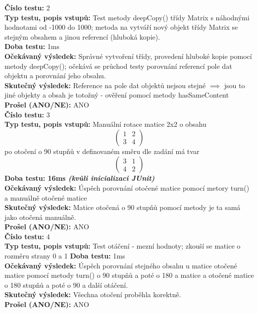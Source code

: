 \documentclass[a4paper,12pt]{article}
\begin{document}
     \textbf{Číslo testu:} 2\\
     \textbf{Typ testu, popis vstupů:} Test metody deepCopy() třídy Matrix s náhodnými hodnotami od -1000 do 1000;
     metoda na vytváří nový objekt třídy Matrix se stejným obsahem a jinou referencí (hluboká kopie).\\
     \textbf{Doba testu:} 1ms\\
     \textbf{Očekávaný výsledek:} Správné vytvoření třídy, provedení hluboké kopie pomocí metody deepCopy(); očekává se průchod testy porovnání referencí pole dat objektu a porovnání jeho obsahu.\\
     \textbf{Skutečný výsledek:} Reference na pole dat objektů nejsou stejné $\implies$ jsou to jiné objekty a obsah je totožný - ověření pomocí metody hasSameContent\\
     \textbf{Prošel (ANO/NE):} ANO\\

     \textbf{Číslo testu:} 3\\
     \textbf{Typ testu, popis vstupů:} Manuální rotace matice 2x2 o obsahu
          \[\begin{pmatrix}
               1 & 2 \\
               3 & 4
          \end{pmatrix}\] po otočení o 90 stupňů v definovaném směru dle zadání má tvar\\
          \[\begin{pmatrix}
                    3 & 1\\
                    4 & 2
          \end{pmatrix}\]
     \textbf{Doba testu: 16ms \textit{(kvůli inicializaci JUnit)}} \\
     \textbf{Očekávaný výsledek:} Úspěch porovnání otočené matice pomocí metory turn() a manuálně otočené matice\\
     \textbf{Skutečný výsledek:} Matice otočená o 90 stupňů pomocí metody je ta samá jako otočená manuálně.\\
     \textbf{Prošel (ANO/NE):} ANO\\

     \textbf{Číslo testu:} 4\\
     \textbf{Typ testu, popis vstupů:} Test otáčení - mezní hodnoty; zkouší se matice o rozměru strany 0 a 1
     \textbf{Doba testu:} 1ms \\
     \textbf{Očekávaný výsledek:} Úspěch porovnání stejného obsahu u matice otočené matice pomocí metody turn()
     o 90 stupňů a poté o 180 a matice a otočené matice o 180 stupňů a poté o 90 a další otáčení.\\
     \textbf{Skutečný výsledek:} Všechna otočení proběhla korektně.\\
     \textbf{Prošel (ANO/NE):} ANO\\
\end{document}
